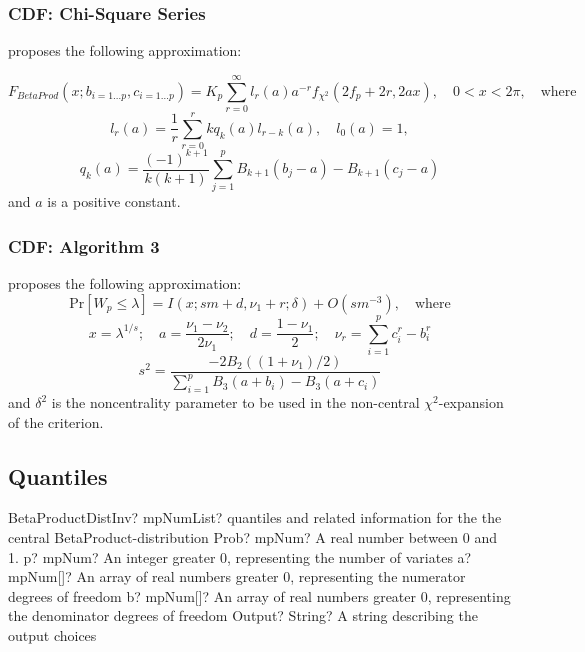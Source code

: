 \subsubsection{CDF: Chi-Square Series}

\cite{Tang_1987} proposes the following approximation:

\begin{equation}
	F_{BetaProd}(x; b_{i=1\ldots p},c_{i=1\ldots p}) = K_p \sum_{r=0}^\infty l_r(a) a^{-r} f_{\chi^2}(2 f_p +2r, 2ax), \quad 0<x<2\pi, \quad  \text{where}
\end{equation}
\begin{equation}
	l_r(a) = \frac{1}{r} \sum_{r=0}^r k q_k(a) l_{r-k}(a), \quad l_0(a)=1,
\end{equation}
\begin{equation}
	q_k(a) = \frac{(-1)^{k+1}}{k(k+1)} \sum_{j=1}^p{B_{k+1}(b_j-a) - B_{k+1}(c_j-a)}
\end{equation}
and $a$ is a positive constant. 





\subsubsection{CDF: Algorithm 3}
\cite{Nagarsenker_1983} proposes the following approximation:
\begin{equation}
	\text{Pr}[W_p \leq \lambda] =  I(x; sm + d, \nu_1 + r; \delta) + O(sm^{-3}), \quad \text{where}
\end{equation}
\begin{equation}
	x=\lambda^{1/s}; \quad a=\frac{\nu_1 - \nu_2}{2\nu_1}; \quad d=\frac{1-\nu_1}{2};  \quad \nu_r=\sum_{i=1}^p{c_i^r - b_i^r}
\end{equation}
\begin{equation}
	s^2 = \frac{-2B_2((1+\nu_1)/2)}{\sum_{i=1}^p{B_3(a+b_i) - B_3(a+c_i) }}
\end{equation}
and $\delta^2$ is the noncentrality parameter to be used in the non-central $\chi^2$-expansion of the criterion.


\subsection{Quantiles}

\begin{mpFunctionsExtract}
	\mpFunctionFiveNotImplemented
	{BetaProductDistInv? mpNumList? quantiles and related information for the the central BetaProduct-distribution}
	{Prob? mpNum? A real number between 0 and 1.}
	{p? mpNum? An integer greater 0, representing the number of variates}
	{a? mpNum[]? An array of real numbers greater 0, representing the numerator  degrees of freedom}
	{b? mpNum[]? An array of real numbers greater 0, representing the denominator degrees of freedom}
	{Output? String? A string describing the output choices}
\end{mpFunctionsExtract}

